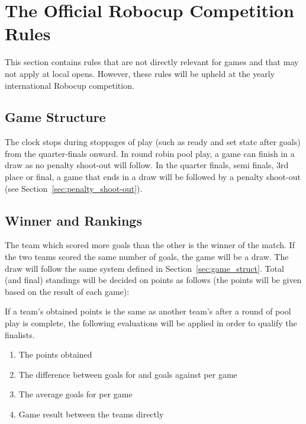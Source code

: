 \documentclass[12pt]{article}
\begin{document}
\newpage


\section{The Official Robocup Competition Rules}
\label{sec:comRules}
This section contains rules that are not directly relevant for games and that may not apply at local opens.  However, these rules will be upheld at the yearly international Robocup competition.

\subsection{Game Structure}

The clock stops during stoppages of play (such as ready and set state after goals) from the quarter-finals onward.  In round robin pool play, a game can finish in a draw as no penalty shoot-out will follow. In the quarter finals, semi finals, 3rd place or final, a game that ends in a draw will be followed by a penalty shoot-out (see Section~\ref{sec:penalty_shoot-out}).

\subsection{Winner and Rankings}

The team which scored more goals than the other is the winner of the match. If the two teams scored the same number of goals, the game will be a draw. The draw will follow the same system defined in Section~\ref{sec:game_struct}. Total (and final) standings will be decided on points as follows (the points will be given based on the result of each game):


If a team's obtained points is the same as another team's after a round of pool play is complete, the following evaluations will be applied in order to qualify the finalists.

\begin{enumerate}

\item The points obtained

\item The difference between goals for and goals against per game

\item The average goals for per game

\item Game result between the teams directly

\end{enumerate}
\end{document}
